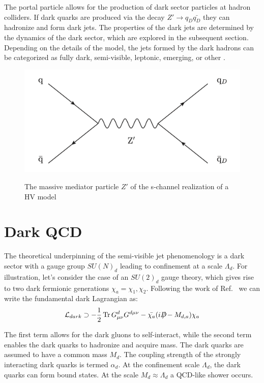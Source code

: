 The portal particle allows for the production of dark sector particles at hadron colliders. If dark quarks are produced via the decay $Z' \rightarrow q_D \bar{q_D}$ they can hadronize and form dark jets. The properties of the dark jets are determined by the dynamics of the dark sector, which are explored in the subsequent section. Depending on the details of the model, the jets formed by the dark hadrons can be categorized as fully dark, semi-visible, leptonic, emerging, or other \cite{snowmass}. \par

\begin{figure}[h]
        \centering
	\includegraphics[width=.5\textwidth]{figures/ch2/zprime_feynman_diagram.png}
        \label{fig:ch2/zprime_feynman_diagram.png}
        \caption{The massive mediator particle $Z'$ of the s-channel realization of a HV model}
\end{figure}

\section{Dark QCD}
\label{sec:darkqcd}
The theoretical underpinning of the semi-visible jet phenomenology is a dark sector with a gauge group $SU(N)_d$ leading to confinement at a scale $\Lambda_d$. For illustration, let's consider the case of an $SU(2)_d$ gauge theory, which gives rise to two dark fermionic generations $\chi_a = \chi_1, \chi_2$. Following the work of Ref.~\cite{darkqcd} we can write the fundamental dark Lagrangian as:
\begin{equation}
	\mathcal{L}_{dark} \supset - \frac{1}{2} \Tr G^{d}_{\mu\nu} G^{d\mu\nu} - \bar{\chi_a} (i {D\mkern-11.5mu/}-M_{d,a}) \chi_a
\end{equation}

The first term allows for the dark gluons to self-interact, while the second term enables the dark quarks to hadronize and acquire mass. The dark quarks are assumed to have a common mass $M_d$. The coupling strength of the strongly interacting dark quarks is termed $\alpha_d$. At the confinement scale $\Lambda_d$, the dark quarks can form bound states. At the scale $M_d \approx \Lambda_d$ a QCD-like shower occurs. \par 

